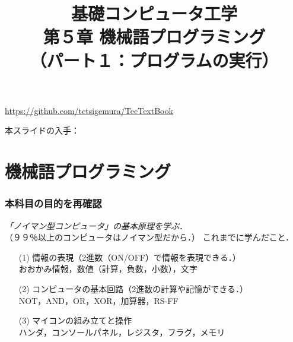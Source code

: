 \documentclass[handout]{beamer}        %
\begin{document}
\title{基礎コンピュータ工学\\第５章 機械語プログラミング\\
       （パート１：プログラムの実行）}
\date{}

\begin{frame}
  \titlepage
  \centerline{\url{https://github.com/tctsigemura/TecTextBook}}
  \vfill
  \centerline{本スライドの入手：
    }
\end{frame}


\section{機械語プログラミング}
\begin{frame}
  \frametitle{本科目の目的を再確認}
  \emph{「ノイマン型コンピュータ」の基本原理を学ぶ．}\\
  （９９％以上のコンピュータはノイマン型だから．）
  \vfill
  これまでに学んだこと．
  \begin{enumerate}
    \item[(1)] 情報の表現（2進数（ON/OFF）で情報を表現できる．）\\
      おおかみ情報，数値（計算，負数，小数），文字
      \vfill
    \item[(2)] コンピュータの基本回路（2進数の計算や記憶ができる．）\\
      NOT，AND，OR，XOR，加算器，RS-FF
      \vfill
    \item[(3)] マイコンの組み立てと操作\\
      ハンダ，コンソールパネル，レジスタ，フラグ，メモリ
  \end{enumerate}
  \vfill
\end{frame}
\end{document}
